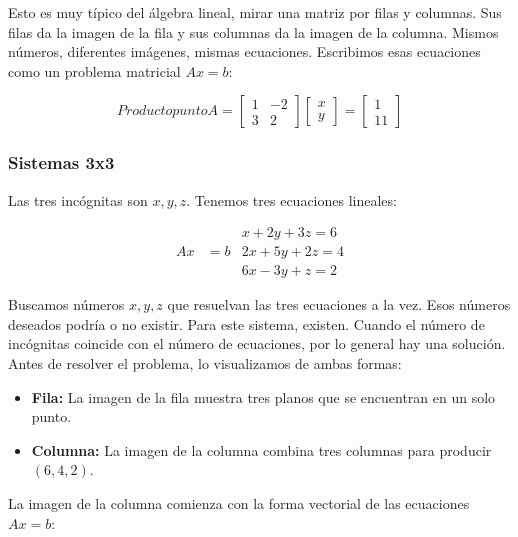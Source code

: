 Esto es muy típico del álgebra lineal, mirar una matriz por filas y columnas. Sus filas
da la imagen de la fila y sus columnas da la imagen de la columna. Mismos números, diferentes
imágenes, mismas ecuaciones. Escribimos esas ecuaciones como un problema matricial $Ax = b$:

\begin{equation*}
	\text{}{Producto punto } A=\begin{bmatrix} 1& -2\\ 3& 2\end{bmatrix}\begin{bmatrix} x\\ y \end{bmatrix}=\begin{bmatrix} 1\\ 11 \end{bmatrix}
\end{equation*}


\subsubsection{Sistemas 3x3}

Las tres incógnitas son $x, y, z$. Tenemos tres ecuaciones lineales:

\begin{align*}
	   &    & x + 2y+ 3z=6 \\
	Ax & =b & 2x+5y+2z=4   \\
	   &    & 6x-3y+z=2
\end{align*}

Buscamos números $x, y, z$ que resuelvan las tres ecuaciones a la vez. Esos números deseados
podría o no existir. Para este sistema, existen. Cuando el número de incógnitas
coincide con el número de ecuaciones, por lo general hay una solución. Antes de resolver el problema,
lo visualizamos de ambas formas:

\begin{itemize}
	\item \textbf{Fila:} La imagen de la fila muestra tres planos que se encuentran en un solo punto.
	\item \textbf{Columna:} La imagen de la columna combina tres columnas para producir $(6,4,2)$.
\end{itemize}

La imagen de la columna comienza con la forma vectorial de las ecuaciones $Ax = b$:

